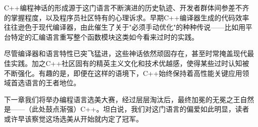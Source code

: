 C++编程神话的形成源于这门语言不断演进的历史轨迹、开发者群体间参差不齐的掌握程度，以及程序员社区特有的心理诉求。早期C++编译器生成的代码效率往往逊色于现代编译器，由此催生了关于"必须手动优化"的种种传说——比如用平台特定的汇编语言重写整个函数模块这类如今看来过时的实践。

尽管编译器和语言特性已突飞猛进，这些神话依然顽固存在，甚至时常掩盖现代最佳实践。加之C++社区固有的精英主义文化和技术优越感，使得某些过时认知被不断强化。有趣的是，即便在这样的语境下，C++始终保持着高性能关键应用领域首选语言的王者地位。

下一章我们将举办编程语言选美大赛，经过层层淘汰后，最终加冕的无冕之王自然是——（此处鼓点渐强）C++。坦白说，我们对这门语言的偏爱如此明显，读者或许早该察觉这场选美从开始就内定了冠军。